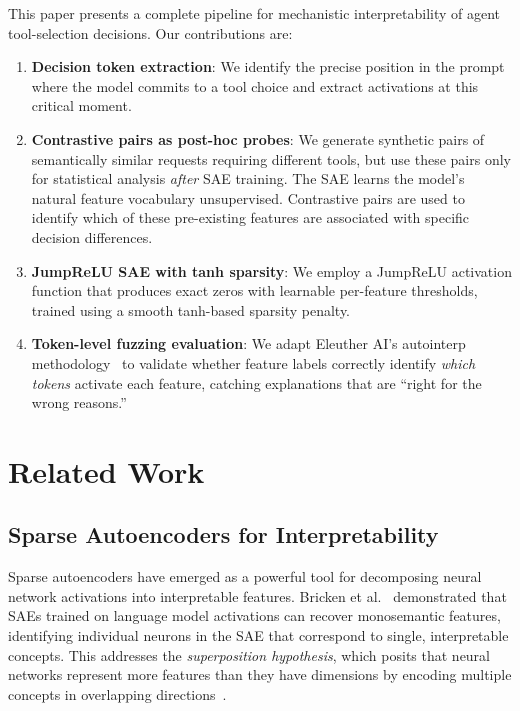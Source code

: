 \documentclass[runningheads]{llncs}
\begin{document}
This paper presents a complete pipeline for mechanistic interpretability of agent tool-selection decisions. Our contributions are:

\begin{enumerate}
\item \textbf{Decision token extraction}: We identify the precise position in the prompt where the model commits to a tool choice and extract activations at this critical moment.
\item \textbf{Contrastive pairs as post-hoc probes}: We generate synthetic pairs of semantically similar requests requiring different tools, but use these pairs only for statistical analysis \emph{after} SAE training. The SAE learns the model's natural feature vocabulary unsupervised. Contrastive pairs are used to identify which of these pre-existing features are associated with specific decision differences.
\item \textbf{JumpReLU SAE with tanh sparsity}: We employ a JumpReLU activation function that produces exact zeros with learnable per-feature thresholds, trained using a smooth tanh-based sparsity penalty.
\item \textbf{Token-level fuzzing evaluation}: We adapt Eleuther AI's autointerp methodology~\cite{ref_juang2024} to validate whether feature labels correctly identify \emph{which tokens} activate each feature, catching explanations that are ``right for the wrong reasons.''
\end{enumerate}


\section{Related Work}
\label{sec:related}

\subsection{Sparse Autoencoders for Interpretability}

Sparse autoencoders have emerged as a powerful tool for decomposing neural network activations into interpretable features. Bricken et al.~\cite{ref_bricken2023} demonstrated that SAEs trained on language model activations can recover monosemantic features, identifying individual neurons in the SAE that correspond to single, interpretable concepts. This addresses the \emph{superposition hypothesis}, which posits that neural networks represent more features than they have dimensions by encoding multiple concepts in overlapping directions~\cite{elhage2022toymodelssuperposition}.
\end{document}
